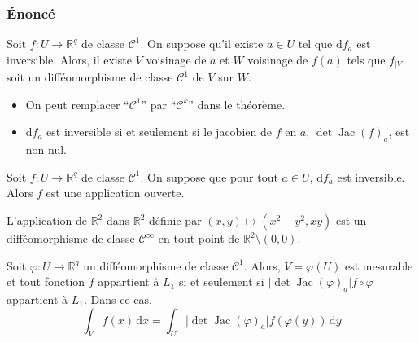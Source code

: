 	\subsubsection{Énoncé}
	
	
	\begin{theorem}
		Soit $f : U \rightarrow \mathbb{R}^q$ de classe $\mathcal{C}^1$. On suppose qu'il existe $a \in U$ tel que $\mathrm{d}f_a$ est inversible.
		\newpar
		Alors, il existe $V$ voisinage de $a$ et $W$ voisinage de $f(a)$ tels que $f_{|V}$ soit un difféomorphisme de classe $\mathcal{C}^1$ de $V$ sur $W$.
	\end{theorem}
	
	\begin{remark}
		\begin{itemize}
			\item On peut remplacer ``$\mathcal{C}^1$'' par ``$\mathcal{C}^k$'' dans le théorème.
			\item $\mathrm{d}f_a$ est inversible si et seulement si le jacobien de $f$ en $a$, $\det \operatorname{Jac}(f)_a$, est non nul.
		\end{itemize}
	\end{remark}
	
	\begin{corollary}
		Soit $f : U \rightarrow \mathbb{R}^q$ de classe $\mathcal{C}^1$. On suppose que pour tout $a \in U$, $\mathrm{d}f_a$ est inversible. Alors $f$ est une application ouverte.
	\end{corollary}
	
	
	\begin{example}
		\label{214-1}
		L'application de $\mathbb{R}^2$ dans $\mathbb{R}^2$ définie par $(x, y) \mapsto (x^2-y^2, xy)$ est un difféomorphisme de classe $\mathcal{C}^\infty$ en tout point de $\mathbb{R}^2 \setminus (0,0)$.
	\end{example}
	
	
	\begin{application}
		Soit $\varphi : U \rightarrow \mathbb{R}^q$ un difféomorphisme de classe $\mathcal{C}^1$. Alors, $V = \varphi(U)$ est mesurable et tout fonction $f$ appartient à $L_1$ si et seulement si $\vert \det \operatorname{Jac}(\varphi)_a \vert f \circ \varphi$ appartient à $L_1$. Dans ce cas,
		\[ \int_V f(x) \, \mathrm{d}x = \int_U \vert \det \operatorname{Jac}(\varphi)_a \vert f (\varphi(y)) \, \mathrm{d}y \]
	\end{application}
	

